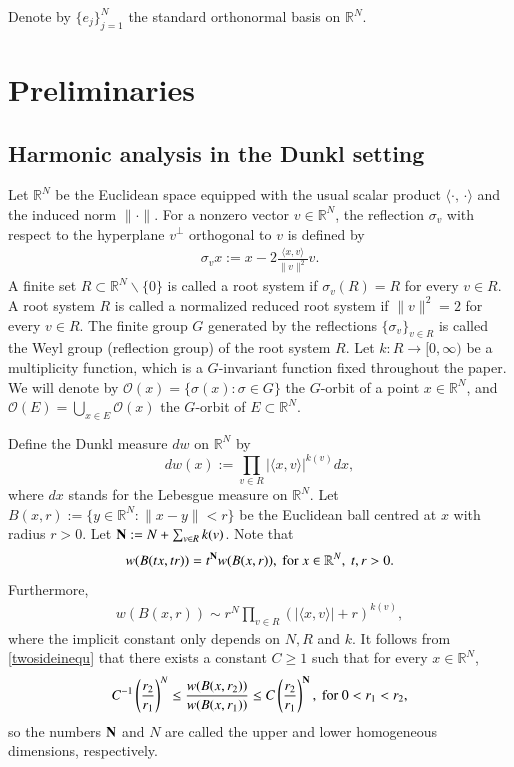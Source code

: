 \documentclass[12pt]{amsart}
\begin{document}
Denote by $\{e_j\}_{j=1}^N$ the standard orthonormal basis on $\mathbb{R}^N$.


\section{Preliminaries}
\setcounter{equation}{0}
\subsection{Harmonic analysis in the Dunkl setting}
Let $\mathbb{R}^N$ be the Euclidean space equipped with the usual scalar product $\langle \cdot,\,\cdot\rangle $ and the induced norm $\|\cdot\|$. For a nonzero vector $v\in \mathbb{R}^N$, the reflection $\sigma_v$ with respect to the hyperplane $v^{\perp}$ orthogonal to $v$ is defined by
\begin{align*}
	\sigma_v x:= x-2\frac{\langle x,v\rangle}{\|v\|^2}v.
\end{align*}
A finite set $R\subset \mathbb{R}^N\backslash \{0\}$ is called a root system if $\sigma_v(R)=R$ for every $v\in R$. A root system $R$ is called a normalized reduced root system if  $\|v\|^2=2$ for every $v\in R$.
The finite group $G$ generated by the reflections $\{\sigma_v\}_{v\in R}$ is called the Weyl group (reflection group) of the root system $R$.
Let $k: R \to [0,\infty)$ be a multiplicity function, which is a $G$-invariant function  fixed throughout the paper. We will denote by $\mathcal O(x)=\{\sigma(x): \sigma \in G\}$ the $G$-orbit of a point $x\in\mathbb{R}^N$, and $\mathcal O(E)=\bigcup_{x \in E} \mathcal O(x)$ the $G$-orbit of $E\subset \mathbb{R}^N$.

Define the Dunkl measure $dw$ on $\mathbb{R}^N$ by
$$
dw(x) :=\prod_{v \in R} |\langle x,v\rangle|^{k(v)} dx,
$$
where $dx$ stands for the Lebesgue measure on $\mathbb{R}^N$. Let $B(x,r):=\{y\in \mathbb{R}^N:\|x-y\|< r\}$ be the Euclidean ball centred at $x$ with radius $r>0$. Let ${\bf N}:=N+\sum_{v\in R}k(v)$. Note that
$$w(B(tx,tr))=t^{{\bf N}}w(B(x,r)),\ {\rm for}\ x\in\mathbb{R}^N,\ t,r>0.$$
Furthermore,
\begin{align}\label{twosideinequ}
  w(B(x,r))\sim r^N \prod_{v \in R}(|\langle x, v \rangle |+r)^{k(v)},
\end{align}
where the implicit constant only depends on $N,R$ and $k$.  It follows from \eqref{twosideinequ} that there exists a constant $C\geq 1$ such that for every $x\in \mathbb{R}^N$,
\begin{align}\label{doublinginequality}
C^{-1}\left(\frac{r_2}{r_1}\right)^N\leq \frac{w(B(x,r_2))}{w(B(x,r_1))}\leq C\left(\frac{r_2}{r_1}\right)^\N,\ {\rm for}\ 0<r_1<r_2,
\end{align}
so the numbers ${\bf N}$ and $N$ are called the upper and lower homogeneous dimensions, respectively.
\end{document}
